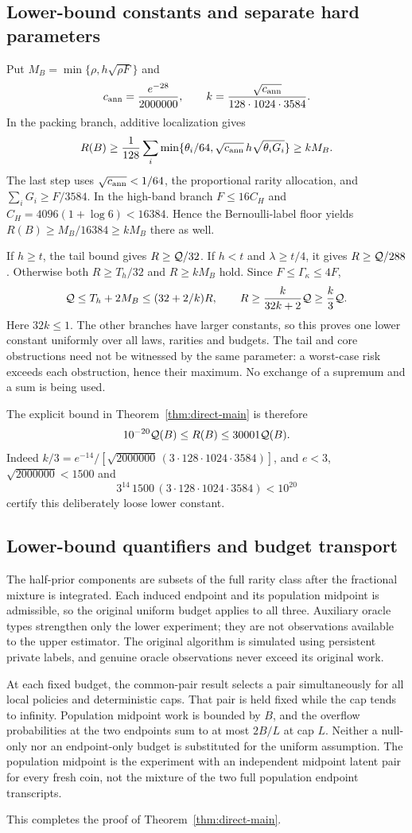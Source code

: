 \subsection{Lower-bound constants and separate hard parameters}
Put $M_B=\min\{\rho,h\sqrt{\rho F}\}$ and
\[
 c_{\rm ann}=\frac{e^{-28}}{2000000},\qquad
 k=\frac{\sqrt{c_{\rm ann}}}{128\cdot1024\cdot3584}.
\]
In the packing branch, additive localization gives
\[
 R(B)\ge\frac1{128}\sum_i
      \min\{\theta_i/64,\sqrt{c_{\rm ann}}\,h\sqrt{\theta_iG_i}\}
 \ge k M_B.
\]
The last step uses $\sqrt{c_{\rm ann}}<1/64$, the proportional rarity
allocation, and $\sum_iG_i\ge F/3584$.
In the high-band branch $F\le16C_H$ and
$C_H=4096(1+\log6)<16384$. Hence the Bernoulli-label floor yields
$R(B)\ge M_B/16384\ge kM_B$ there as well.

If $h\ge t$, the tail bound gives $R\ge\mathcal Q/32$.
If $h<t$ and $\lambda\ge t/4$, it gives $R\ge\mathcal Q/288$.
Otherwise both $R\ge T_h/32$ and $R\ge kM_B$ hold. Since
$F\le\Gamma_\kappa\le4F$,
\[
 \mathcal Q\le T_h+2M_B\le(32+2/k)R,
 \qquad R\ge\frac{k}{32k+2}\mathcal Q\ge\frac{k}{3}\mathcal Q.
\]
Here $32k\le1$. The other branches have larger constants, so this proves
one lower constant uniformly over all laws, rarities and budgets.
The tail and core obstructions need not be witnessed by the same
parameter: a worst-case risk exceeds each obstruction, hence their
maximum. No exchange of a supremum and a sum is being used.

The explicit bound in Theorem~\ref{thm:direct-main} is therefore
\[
             10^{-20}\mathcal Q(B)\le R(B)\le30001\mathcal Q(B).
\]
Indeed $k/3=e^{-14}/[\sqrt{2000000}\,(3\cdot128\cdot1024\cdot3584)]$,
and $e<3$, $\sqrt{2000000}<1500$ and
\[
 3^{14}\,1500\,(3\cdot128\cdot1024\cdot3584)<10^{20}
\]
certify this deliberately loose lower constant.

\subsection{Lower-bound quantifiers and budget transport}
The half-prior components are subsets of the full rarity class after
the fractional mixture is integrated. Each induced endpoint and its
population midpoint is admissible, so the original uniform budget
applies to all three. Auxiliary oracle types strengthen only the lower
experiment; they are not observations available to the upper estimator.
The original algorithm is simulated using persistent private labels,
and genuine oracle observations never exceed its original work.

At each fixed budget, the common-pair result selects a pair simultaneously
for all local policies and deterministic caps. That pair is held fixed
while the cap tends to infinity. Population midpoint work is bounded by
$B$, and the overflow probabilities at the two endpoints sum to at most
$2B/L$ at cap $L$. Neither a null-only nor an endpoint-only budget is
substituted for the uniform assumption. The population midpoint is the
experiment with an independent midpoint latent pair for every fresh
coin, not the mixture of the two full population endpoint transcripts.

This completes the proof of Theorem~\ref{thm:direct-main}.
